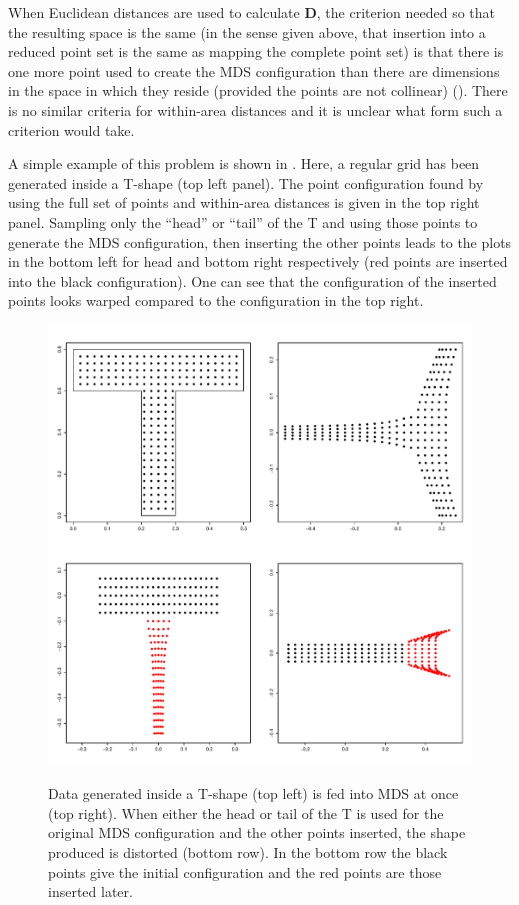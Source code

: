 When Euclidean distances are used to calculate $\mathbf{D}$, the criterion needed so that the resulting space is the same (in the sense given above, that insertion into a reduced point set is the same as mapping the complete point set) is that there is one more point used to create the MDS configuration than there are dimensions in the space in which they reside (provided the points are not collinear) (\cite{landmark}). There is no similar criteria for within-area distances and it is unclear what form such a criterion would take.

A simple example of this problem is shown in . Here, a regular grid has been generated inside a T-shape (top left panel). The point configuration found by using the full set of points and within-area distances is given in the top right panel. Sampling only the ``head'' or ``tail'' of the T and using those points to generate the MDS  configuration, then inserting the other points leads to the plots in the bottom left for head and bottom right respectively (red points are inserted into the black configuration). One can see that the configuration of the inserted points looks warped compared to the configuration in the top right. 

\begin{figure}
\centering
\includegraphics[width=6in]{mds/figs/tshape.pdf} \\
\caption{Data generated inside a T-shape (top left) is fed into MDS at once (top right). When either the head or tail of the T is used for the original MDS configuration and the other points inserted, the shape produced is distorted (bottom row). In the bottom row the black points give the initial configuration and the red points are those inserted later.}
\label{tshape}
\end{figure}

